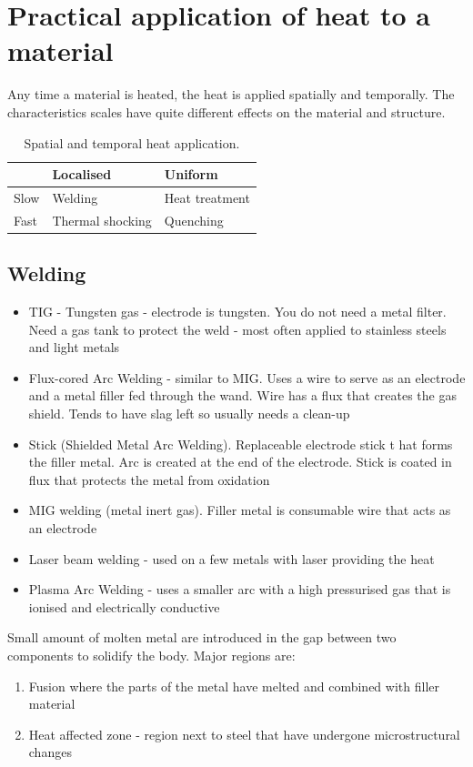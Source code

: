 \section{Practical application of heat to a material}
Any time a material is heated, the heat is applied spatially and temporally. The characteristics scales have quite different effects on the material and structure.
\begin{table}[H]
    \centering
    \begin{tabular}{@{}lll@{}}
        \toprule
             & \textbf{Localised} & \textbf{Uniform} \\
        \midrule
        Slow & Welding            & Heat treatment   \\
        Fast & Thermal shocking   & Quenching        \\
        \bottomrule
    \end{tabular}
    \caption{Spatial and temporal heat application.}
\end{table}
\subsection{Welding}
\begin{itemize}
    \item TIG - Tungsten gas - electrode is tungsten. You do not need a metal filter. Need a gas tank to protect the weld - most often applied to stainless steels and light metals
    \item Flux-cored Arc Welding - similar to MIG. Uses a wire to serve as an electrode and a metal filler fed through the wand. Wire has a flux that creates the gas shield. Tends to have slag left so usually needs a clean-up
    \item Stick (Shielded Metal Arc Welding). Replaceable electrode stick t hat forms the filler metal. Arc is created at the end of the electrode. Stick is coated in flux that protects the metal from oxidation
    \item MIG welding (metal inert gas). Filler metal is consumable wire that acts as an electrode
    \item Laser beam welding - used on a few metals with laser providing the heat
    \item Plasma Arc Welding - uses a smaller arc with a high pressurised gas that is ionised and electrically conductive
\end{itemize}
Small amount of molten metal are introduced in the gap between two components to solidify the body. Major regions are:
\begin{enumerate}
    \item Fusion where the parts of the metal have melted and combined with filler material
    \item Heat affected zone - region next to steel that have undergone microstructural changes
\end{enumerate}
